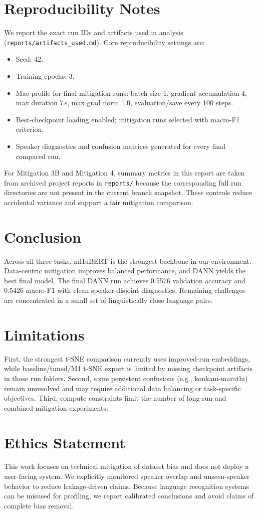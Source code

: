 \documentclass[11pt]{article}
\begin{document}
\section{Reproducibility Notes}
We report the exact run IDs and artifacts used in analysis (\texttt{reports/artifacts\_used.md}). Core reproducibility settings are:
\begin{itemize}
    \item Seed: 42.
    \item Training epochs: 3.
    \item Mac profile for final mitigation runs: batch size 1, gradient accumulation 4, max duration 7\,s, max grad norm 1.0, evaluation/save every 100 steps.
    \item Best-checkpoint loading enabled; mitigation runs selected with macro-F1 criterion.
    \item Speaker diagnostics and confusion matrices generated for every final compared run.
\end{itemize}
For Mitigation 3B and Mitigation 4, summary metrics in this report are taken from archived project reports in \texttt{reports/} because the corresponding full run directories are not present in the current branch snapshot.
These controls reduce accidental variance and support a fair mitigation comparison.

\FloatBarrier

\section{Conclusion}
Across all three tasks, mHuBERT is the strongest backbone in our environment. Data-centric mitigation improves balanced performance, and DANN yields the best final model. The final DANN run achieves 0.5576 validation accuracy and 0.5426 macro-F1 with clean speaker-disjoint diagnostics. Remaining challenges are concentrated in a small set of linguistically close language pairs.

\section*{Limitations}
First, the strongest t-SNE comparison currently uses improved-run embeddings, while baseline/tuned/M1 t-SNE export is limited by missing checkpoint artifacts in those run folders. Second, some persistent confusions (e.g., konkani-marathi) remain unresolved and may require additional data balancing or task-specific objectives. Third, compute constraints limit the number of long-run and combined-mitigation experiments.

\section*{Ethics Statement}
This work focuses on technical mitigation of dataset bias and does not deploy a user-facing system. We explicitly monitored speaker overlap and unseen-speaker behavior to reduce leakage-driven claims. Because language recognition systems can be misused for profiling, we report calibrated conclusions and avoid claims of complete bias removal.

\FloatBarrier


\end{document}
